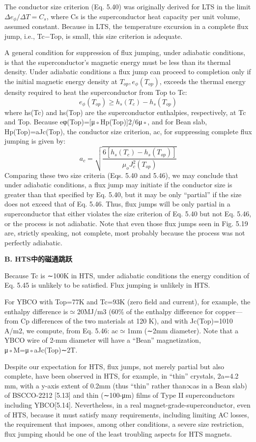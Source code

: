 The conductor size criterion (Eq. 5.40) was originally derived for LTS in the limit
$\Delta e_\phi/\Delta T=C_s$, where Cs is the superconductor heat capacity per unit volume,
assumed constant. Because in LTS, the temperature excursion in a complete flux
jump, i.e., Tc−Top, is small, this size criterion is adequate.

A general condition for suppression of flux jumping, under adiabatic conditions, is
that the superconductor’s magnetic energy must be less than its thermal density.
Under adiabatic conditions a flux jump can proceed to completion only if the
initial magnetic energy density at $T_{op}, e_\phi(T_{op})$, exceeds the thermal energy density
required to heat the superconductor from Top to Tc:
\begin{equation}%
e_{\phi}(T_{op})\geq h_{s}(T_{c})-h_{s}(T_{op})
\end{equation}
where hs(Tc) and hs(Top) are the superconductor enthalpies, respectively, at Tc and
Top. Because eφ(Top)=[μ◦Hp(Top)]2/6μ◦, and for Bean slab, Hp(Top)=aJc(Top),
the conductor size criterion, ac, for suppressing complete flux jumping is given by:
\begin{equation}%
a_{c}=\sqrt{\frac{6[h_{s}(T_{c})-h_{s}(T_{op})]}{\mu_{o}J_{c}^{2}(T_{op})}}
\end{equation}
Comparing these two size criteria (Eqs. 5.40 and 5.46), we may conclude that under
adiabatic conditions, a flux jump may initiate if the conductor size is greater than
that specified by Eq. 5.40, but it may be only “partial” if the size does not exceed
that of Eq. 5.46. Thus, flux jumps will be only partial in a superconductor that
either violates the size criterion of Eq. 5.40 but not Eq. 5.46, or the process is not
adiabatic. Note that even those flux jumps seen in Fig. 5.19 are, strictly speaking,
not complete, most probably because the process was not perfectly adiabatic.

\textbf{B. HTS中的磁通跳跃}

Because Tc is ∼100K in HTS, under adiabatic conditions the energy condition of
Eq. 5.45 is unlikely to be satisfied. Flux jumping is unlikely in HTS.

For YBCO with Top=77K and Tc=93K (zero field and current), for example, the
enthalpy difference is$\simeq$20MJ/m3 (60\% of the enthalpy difference for copper—
from Cp differences of the two materials at 120 K), and with Jc(Top)=1010 A/m2,
we compute, from Eq. 5.46: ac$\simeq$1mm (∼2mm diameter). Note that a YBCO
wire of 2-mm diameter will have a “Bean” magnetization, μ◦M=μ◦aJc(Top)∼2T.

Despite our expectation for HTS, flux jumps, not merely partial but also complete,
have been observed in HTS, for example, in “thin” crystals, 2a=4.2 mm,
with a y-axis extent of 0.2mm (thus “thin” rather than$\infty$as in a Bean slab) of
BSCCO-2212 [5.13] and thin (∼100-μm) films of Type II superconductors including
YBCO[5.14]. Nevertheless, in a real magnet-grade-superconductor, even of
HTS, because it must satisfy many requirements, including limiting AC losses, the
requirement that imposes, among other conditions, a severe size restriction, flux
jumping should be one of the least troubling aspects for HTS magnets.
